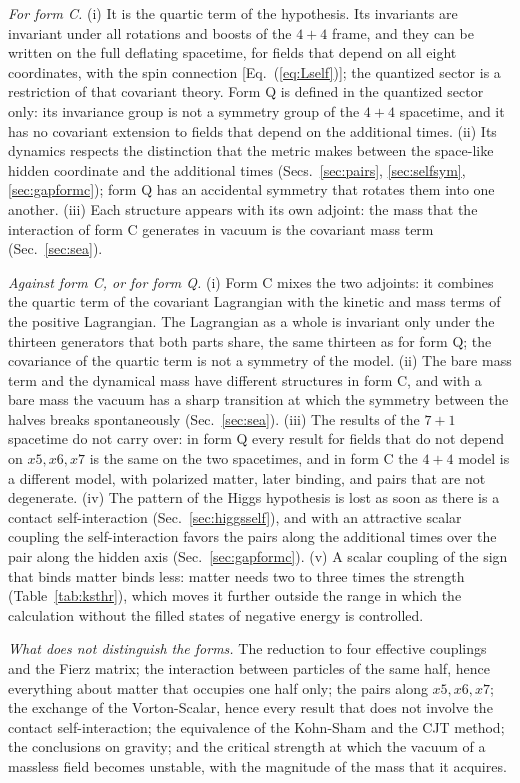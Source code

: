 \emph{For form C.} (i) It is the quartic term of the hypothesis. Its invariants are invariant under
all rotations and boosts of the $4+4$ frame, and they can be written on the full deflating
spacetime, for fields that depend on all eight coordinates, with the spin connection
[Eq.~(\ref{eq:Lself})]; the quantized sector is a restriction of that covariant theory. Form Q is
defined in the quantized sector only: its invariance group is not a symmetry group of the $4+4$
spacetime, and it has no covariant extension to fields that depend on the additional times. (ii) Its
dynamics respects the distinction that the metric makes between the space-like hidden coordinate
and the additional times (Secs.~\ref{sec:pairs}, \ref{sec:selfsym}, \ref{sec:gapformc}); form Q has
an accidental symmetry that rotates them into one another. (iii) Each structure appears with its own
adjoint: the mass that the interaction of form C generates in vacuum is the covariant mass term
(Sec.~\ref{sec:sea}).

\emph{Against form C, or for form Q.} (i) Form C mixes the two adjoints: it combines the quartic
term of the covariant Lagrangian with the kinetic and mass terms of the positive Lagrangian. The
Lagrangian as a whole is invariant only under the thirteen generators that both parts share, the
same thirteen as for form Q; the covariance of the quartic term is not a symmetry of the model.
(ii) The bare mass term and the dynamical mass have different structures in form C, and with a bare
mass the vacuum has a sharp transition at which the symmetry between the halves breaks
spontaneously (Sec.~\ref{sec:sea}). (iii) The results of the $7+1$ spacetime do not carry over: in
form Q every result for fields that do not depend on $x5,x6,x7$ is the same on the two spacetimes,
and in form C the $4+4$ model is a different model, with polarized matter, later binding, and pairs
that are not degenerate. (iv) The pattern of the Higgs hypothesis is lost as soon as there is a
contact self-interaction (Sec.~\ref{sec:higgsself}), and with an attractive scalar coupling the
self-interaction favors the pairs along the additional times over the pair along the hidden axis
(Sec.~\ref{sec:gapformc}). (v) A scalar coupling of the sign that binds matter binds less: matter
needs two to three times the strength (Table~\ref{tab:ksthr}), which moves it further outside the
range in which the calculation without the filled states of negative energy is controlled.

\emph{What does not distinguish the forms.} The reduction to four effective couplings and the Fierz
matrix; the interaction between particles of the same half, hence everything about matter that
occupies one half only; the pairs along $x5,x6,x7$; the exchange of the Vorton-Scalar, hence every
result that does not involve the contact self-interaction; the equivalence of the Kohn-Sham and the
CJT method; the conclusions on gravity; and the critical strength at which the vacuum of a massless
field becomes unstable, with the magnitude of the mass that it acquires.

